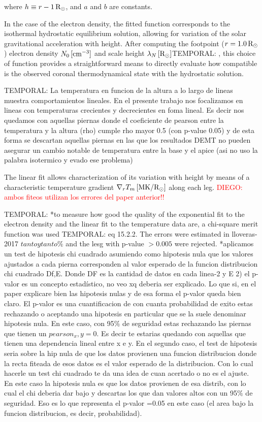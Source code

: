 \documentclass[namedreferences]{solarphysics}
\newcommand{\mrsun}{{\rm R_\odot}}
\newcommand{\MK}{{\rm MK}}
\newcommand{\cm}{{\rm cm}}
\newcommand{\lN}{\lambda_N}
\def\diego#1{\textcolor{red}{DIEGO: #1}}
\def\temp#1{\textcolor{mygray}{TEMPORAL: #1}}
\begin{document}
\begin{article}
\noindent
where $h \equiv r - 1\,\mrsun$, and $a$ and $b$ are constants. 

In the case of the electron density, the fitted function corresponds to the isothermal hydrostatic equilibrium solution, allowing for variation of the solar gravitational acceleration with height. After computing the footpoint ($r=1.0\,\mrsun$) electron density $N_{0}\,[\cm^{-3}]$ and scale height $\lN\,[\mrsun]$\temp{, this choice of function provides a straightforward means to directly evaluate how compatible is the observed coronal thermodynamical state with the hydrostatic solution}.

\temp{
La temperatura en funcion de la altura a lo largo de lineas muestra comportamientos lineales. En el presente trabajo nos focalizamos en lineas con temperaturas crecientes y decrecientes en foma lineal. Es decir nos quedamos con aquellas piernas donde el coeficiente de pearson entre la temperatura y la altura (rho) cumple rho mayor 0.5 (con p-value 0.05) y de esta forma se descartan aquellas piernas en las que los resultados DEMT no pueden asegurar un cambio notable de temperatura entre la base y el apice (asi no uso la palabra isotermico y evado ese problema)
}

The linear fit allows characterization of its variation with height by means of a characteristic temperature gradient $\nabla_r T_m\,[\MK/\mrsun]$ along each leg.
\diego{ambos fiteos utilizan los errores del paper anterior!!}

\temp{
*to measure how good the quality of the exponential fit to the electron density and the linear fit to the temperature data are, a chi-square merit function was used \temp{eq 15.2.2}. The errors were estimated in lloveras-2017 $tanto y tanto \%$ and the lesg with p-value $>0.005$ were rejected. 
*aplicamos un test de hipotesis chi cuadrado asumiendo como hipotesis nula que los valores ajustados a cada pierna corresponden al valor esperado de la funcion distribucion chi cuadrado Df,E. Donde DF es la cantidad de datos en cada linea-2 y E
2) el p-valor es un concepto estadístico, no veo xq deberia ser explicado. Lo que si, en el paper explicare bien las hipotesis nulas y de esa forma el p-valor queda bien claro.
El p-valor es una cuantificacion de con cuanta probabilidad de exito estas rechazando o aceptando una hipotesis en particular que se la suele denominar hipotesis nula.
En este caso, con 95$\%$ de seguridad estas rechazando las piernas que tienen un $pearson_x,y = 0$. Es decir te estarias quedando con aquellas que tienen una dependencia lineal entre x e y.
En el segundo caso, el test de hipotesis seria sobre la hip nula de que los datos provienen una funcion distribucion donde la recta fiteada de esos datos es el valor esperado de la distribucion. Con lo cual hacerle un test chi cuadrado te da una idea de cuan acertado o no es el ajuste. En este caso la hipotesis nula es que los datos provienen de esa distrib, con lo cual el chi deberia dar bajo y descartas los que dan valores altos con un 95$\%$ de seguridad. Eso es lo que representa el p-valor =0.05 en este caso (el area bajo la funcion distribucion, es decir, probabilidad).
}


\end{article}
\end{document}
